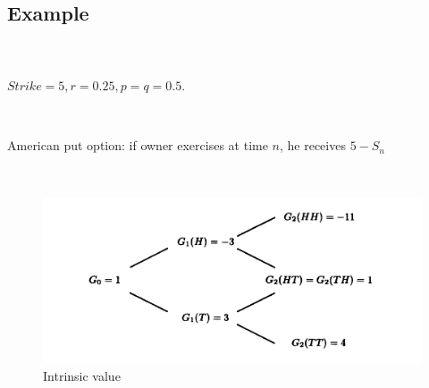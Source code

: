 \documentclass[c, dvipsnames, 8pt]{beamer}
\begin{document}
\subsection{Example}


\begin{frame}[shrink=5]

\frametitle{\insertsection} 
\framesubtitle{\insertsubsection} 

\

$Strike = 5, r = 0.25, p=q=0.5$. 

\

American put option: if owner exercises at time $n$, he receives $5 - S_n$

\

\begin{figure}
	\centering
	\includegraphics[width=0.9\linewidth]{screenshot005}
	\caption{Intrinsic value}
	\label{fig:screenshot005}
\end{figure}


\end{frame}
\end{document}
